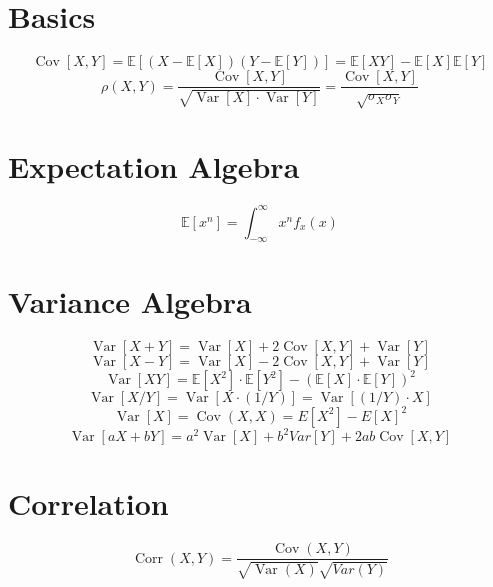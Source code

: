 \documentclass[twocolumn]{amsart}
\newcommand{\E}{\mathbb{E}}
\newcommand{\Cov}{\operatorname{Cov}}
\newcommand{\Corr}{\operatorname{Corr}}
\newcommand{\Var}{\operatorname{Var}}
\begin{document}
\section*{Basics}

\begin{equation*}
  \Cov[X,Y] = \E[(X-\E[X])(Y-\E[Y])] = \E[XY] - \E[X]\E[Y]
\end{equation*}
\begin{equation*}
  \rho(X,Y) = \frac{\Cov[X,Y]}{\sqrt{\Var[X]\cdot\Var[Y]}} = \frac{\Cov[X,Y]}{\sqrt{\sigma_{X}\sigma_{Y}}}
\end{equation*}

\section*{Expectation Algebra}
\begin{equation*}
  \E[x^n] = \int_{-\infty}^{\infty} x^n f_{x}(x)
\end{equation*}

\section*{Variance Algebra}
\begin{equation*}
  \Var[X + Y] = \Var[X] + 2\Cov[X, Y] + \Var[Y]
\end{equation*}
\begin{equation*}
  \Var[X - Y] = \Var[X] - 2\Cov[X, Y] + \Var[Y]
\end{equation*}
\begin{equation*}
  \Var[XY] = \E[X^2] \cdot \E[Y^2] - {(\E[X] \cdot \E[Y])}^2
\end{equation*}
\begin{equation*}
  \Var[X/Y] = \Var[X \cdot (1/Y)] = \Var[(1/Y) \cdot X]
\end{equation*}
\begin{equation*}
  \Var[X] = \Cov(X, X) = E[X^2] - {E[X]}^2
\end{equation*}
\begin{equation*}
  \Var[aX+bY] = a^2\Var[X] + b^2 Var[Y] + 2ab\Cov[X,Y]
\end{equation*}

\section*{Correlation}
\begin{equation*}
  \Corr(X, Y) = \frac{\Cov(X, Y)}{\sqrt{\Var(X)}\sqrt{Var(Y)}}
\end{equation*}
\end{document}
